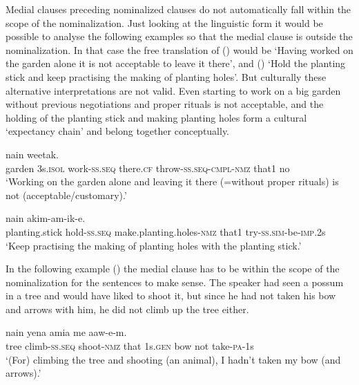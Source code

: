 Medial clauses preceding nominalized clauses do not automatically fall within the scope of the nominalization. Just looking at the linguistic form it would be possible to analyse the following examples so that the medial clause is outside the nominalization. In that case the free translation of () would be `Having worked on the garden alone it is not acceptable to leave it there', and () `Hold the planting stick and keep practising the making of planting holes'. But culturally these alternative interpretations are not valid. Even starting to work on a big garden without previous negotiations and proper rituals is not acceptable, and the holding of the planting stick and making planting holes form a cultural `expectancy chain' and belong together conceptually.

\ea%
\label{ex:x1227}
  nain  weetak. \\
     garden  3s.\textsc{isol}  work-\textsc{ss}.\textsc{seq}  there.\textsc{cf} throw-\textsc{ss}.\textsc{seq}-\textsc{cmpl}-\textsc{nmz}  that1  no \\
\glt `Working on the garden alone and leaving it there (=without proper rituals) is not (acceptable/customary).'
\z

\ea%
\label{ex:x1239}
  nain akim-am-ik-e. \\
     planting.stick  hold-\textsc{ss}.\textsc{seq}  make.planting.holes-\textsc{nmz}  that1 try-\textsc{ss}.\textsc{sim}-be-\textsc{imp}.2s \\
\glt `Keep practising the making of planting holes with the planting stick.'
\z

In the following example () the medial clause has to be within the scope of the nominalization for the sentences to make sense. The speaker had seen a possum in a tree and would have liked to shoot it, but since he had not taken his bow and arrows with him, he did not climb up the tree either.

\ea%
\label{ex:x1844}
  nain  yena  amia  me aaw-e-m. \\
     tree  climb-\textsc{ss}.\textsc{seq}  shoot-\textsc{nmz}  that  1s.\textsc{gen}  bow  not take-\textsc{pa}-1s \\
\glt `(For) climbing the tree and shooting (an animal), I hadn't taken my bow (and arrows).'
\z

